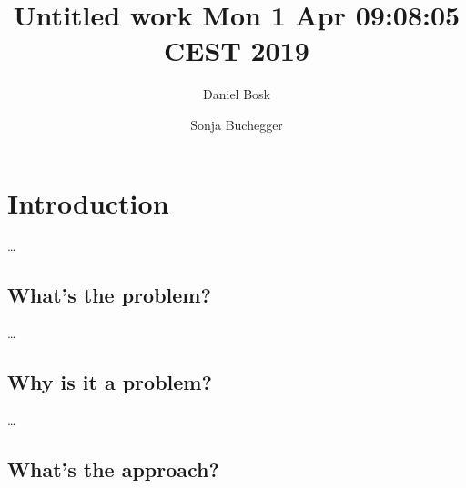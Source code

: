 \title{%
  Untitled work Mon  1 Apr 09:08:05 CEST 2019
}
\author{Daniel Bosk}
\author{Sonja Buchegger}


\mode*

\begin{abstract}
  
\end{abstract}


\section{Introduction}

\dots

\subsection{What's the problem?}

\dots


\subsection{Why is it a problem?}

\dots


\subsection{What's the approach?}


